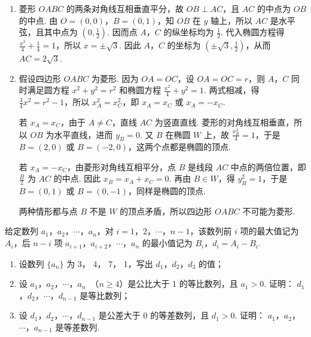 \begin{solution}
\begin{enumerate}
\item 菱形 \(OABC\) 的两条对角线互相垂直平分，故 \(OB\perp AC\)，且 \(AC\) 的中点为 \(OB\) 的中点. 由 \(O=(0,0)\)，\(B=(0,1)\)，知 \(OB\) 在 \(y\) 轴上，所以 \(AC\) 是水平弦，且其中点为 \(\left(0,\frac{1}{2}\right)\). 因而点 \(A\)，\(C\) 的纵坐标均为 \(\frac{1}{2}\). 代入椭圆方程得 \(\frac{x^2}{4}+\frac{1}{4}=1\)，所以 \(x=\pm\sqrt{3}\). 因此 \(A\)，\(C\) 的坐标为 \(\left(\pm\sqrt{3},\frac{1}{2}\right)\)，从而 \(AC=2\sqrt{3}\).
\item 假设四边形 \(OABC\) 为菱形. 因为 \(OA=OC\)，设 \(OA=OC=r\)，则 \(A\)，\(C\) 同时满足圆方程 \(x^2+y^2=r^2\) 和椭圆方程 \(\frac{x^2}{4}+y^2=1\). 两式相减，得 \(\frac{3}{4}x^2=r^2-1\)，所以 \(x_A^2=x_C^2\)，即 \(x_A=x_C\) 或 \(x_A=-x_C\).

若 \(x_A=x_C\)，由于 \(A\neq C\)，直线 \(AC\) 为竖直直线. 菱形的对角线互相垂直，所以 \(OB\) 为水平直线，进而 \(y_B=0\). 又 \(B\) 在椭圆 \(W\) 上，故 \(\frac{x_B^2}{4}=1\)，于是 \(B=(2,0)\) 或 \(B=(-2,0)\)，这两个点都是椭圆的顶点.

若 \(x_A=-x_C\)，由菱形对角线互相平分，点 \(B\) 是线段 \(AC\) 中点的两倍位置，即 \(\frac{B}{2}\) 为 \(AC\) 的中点. 因此 \(x_B=x_A+x_C=0\). 再由 \(B\in W\)，得 \(y_B^2=1\)，于是 \(B=(0,1)\) 或 \(B=(0,-1)\)，同样是椭圆的顶点.

两种情形都与点 \(B\) 不是 \(W\) 的顶点矛盾，所以四边形 \(OABC\) 不可能为菱形.
\end{enumerate}
\end{solution}

\begin{problem}
给定数列 \(a_1\)，\(a_2\)，\(\cdots\)，\(a_n\)，对 \(i = 1\)，\(2\)，\(\cdots\)，\(n-1\)，该数列前 \(i\) 项的最大值记为 \(A_i\)，后 \(n-i\) 项 \(a_{i+1}\)，\(a_{i+2}\)，\(\cdots\)，\(a_n\) 的最小值记为 \(B_i\)，\(d_i = A_i - B_i\).
\begin{enumerate}
\item 设数列 \(\{a_n\}\) 为 3， 4， 7， 1，写出 \(d_1\)，\(d_2\)，\(d_3\) 的值；
\item 设 \(a_1\)，\(a_2\)，\(\cdots\)，\(a_n\ \) （\(n \geqslant 4\)）是公比大于 1 的等比数列，且 \(a_1 > 0\). 证明： \(d_1\)，\(d_2\)，\(\cdots\)，\(d_{n-1}\) 是等比数列；
\item 设 \(d_1\)，\(d_2\)，\(\cdots\)，\(d_{n-1}\) 是公差大于 0 的等差数列，且 \(d_1 > 0\). 证明： \(a_1\)，\(a_2\)，\(\cdots\)，\(a_{n-1}\) 是等差数列.
\end{enumerate}
\end{problem}

